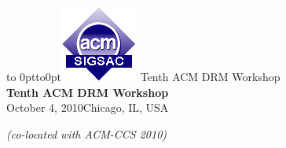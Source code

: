 \documentclass{article}
\begin{document}
\begin{center}
\vbox to 0pt{\hbox to0pt{\hskip10pt\includegraphics[width=.12\hsize]{sigsac.png}\hss}\vss}
  \textcolor[rgb]{.5,.5,.5}{\Huge Tenth ACM DRM Workshop}\\[-2mm]
  {\LARGE\bfseries \textcolor[rgb]{0,.18,.5}{Tenth ACM DRM Workshop~~}}\\[2mm]
  October 4, 2010\qquad{\tiny$^\bullet$}\qquad Chicago, IL, USA
\end{center}
\begin{flushright}
  \textit{(co-located with ACM-CCS 2010)}
\end{flushright}\par\smallskip
\end{document}
